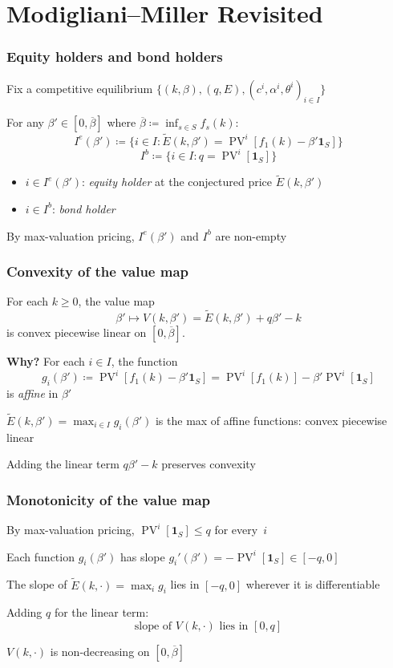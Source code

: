 \documentclass[blue]{beamer}
\DeclareMathOperator\PV{PV}
\def\1{\mathbf{1}}
\def\leq{\leqslant}
\def\geq{\geqslant}
\theoremstyle{definition}
\theoremstyle{example}
\begin{document}
\section{Modigliani--Miller Revisited}
\begin{frame}\frametitle{Equity holders and bond holders}
Fix a competitive equilibrium $\{(k,\beta),(q,E),(c^i,\alpha^i,\theta^i)_{i\in I}\}$
\begin{definition}
For any $\beta' \in [0, \overline{\beta}]$ where $\overline{\beta} \coloneqq \inf_{s \in S} f_s(k)$:
\[
I^e(\beta') \coloneqq \{i \in I \colon \widetilde{E}(k, \beta') = \PV^i[f_1(k) - \beta'\1_S]\}
\]
\[
I^b \coloneqq \{i \in I \colon q = \PV^i[\1_S]\}
\]
\end{definition}
\bigskip
\begin{itemize}
\item $i \in I^e(\beta')$: \emph{equity holder} at the conjectured price $\widetilde{E}(k,\beta')$
\item $i \in I^b$: \emph{bond holder}
\end{itemize}
\bigskip

By max-valuation pricing, $I^e(\beta')$ and $I^b$ are non-empty
\end{frame}
\begin{frame}\frametitle{Convexity of the value map}
\begin{lemma}[Convexity]
For each $k \geq 0$, the value map
\[
\beta' \mapsto V(k, \beta') = \widetilde{E}(k, \beta') + q\beta' - k
\]
is convex piecewise linear on $[0, \overline{\beta}]$.
\end{lemma}
\bigskip

\textbf{Why?} For each $i \in I$, the function
\[
g_i(\beta') \coloneqq \PV^i[f_1(k) - \beta' \1_S] = \PV^i[f_1(k)] - \beta' \PV^i[\1_S]
\]
is \emph{affine} in $\beta'$
\bigskip

$\widetilde{E}(k, \beta') = \max_{i \in I} g_i(\beta')$ is the max of affine functions: \alert{convex piecewise linear}
\bigskip

Adding the linear term $q\beta' - k$ preserves convexity
\end{frame}
\begin{frame}\frametitle{Monotonicity of the value map}
By max-valuation pricing, $\PV^i[\1_S] \leq q$ for every~$i$
\bigskip

Each function $g_i(\beta')$ has slope $g_i'(\beta') = -\PV^i[\1_S] \in [-q, 0]$
\bigskip

The slope of $\widetilde{E}(k, \cdot) = \max_i g_i$ lies in $[-q, 0]$ wherever it is differentiable
\bigskip

Adding $q$ for the linear term:
\[
\text{slope of $V(k, \cdot)$ lies in $[0, q]$}
\]
\bigskip

\alert{$V(k, \cdot)$ is non-decreasing on $[0, \overline{\beta}]$}
\end{frame}
\end{document}
